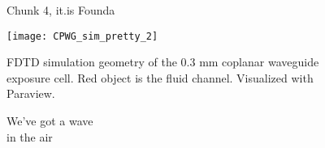 \documentclass[fleqn,10pt]{article}
\begin{document}
\begin{figure}[H]
	\caption{Chunk 4, it.is Founda}
\end{figure}


\clearpage


\begin{figure}[H]
	\captionsetup{singlelinecheck = false, justification=justified}
	\centering
	\texttt{[image: CPWG\_sim\_pretty\_2]}
	\caption{FDTD simulation geometry of the 0.3 mm coplanar waveguide exposure cell. Red object is the fluid channel. Visualized with Paraview.
		}
\end{figure}


\begin{figure}[H]
	\captionsetup{singlelinecheck = false, justification=justified}
	\centering
	
	\caption{
		We've got a wave\\
		in the air}
\end{figure}



\clearpage
















\clearpage





%











%





\end{document}
